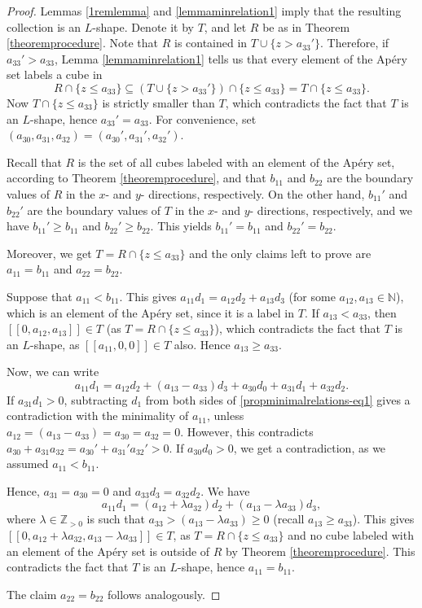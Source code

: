 \documentclass[12pt]{article}
\theoremstyle{remark}
\begin{document}
\begin{proof}
    Lemmas \ref{1remlemma} and \ref{lemmaminrelation1} imply that the resulting collection is an $L$-shape. Denote it by $T$, and let $R$ be as in Theorem \ref{theoremprocedure}.
    Note that $R$ is contained in $T \cup \{z > a_{33}'\}$. Therefore, if 
    $a_{33}'>a_{33}$, Lemma \ref{lemmaminrelation1} tells us that every element of the Ap{\'e}ry set labels a cube in 
    $$
    R \cap \{z \leq a_{33}\} \subseteq  \left(T \cup \{z > a_{33}'\} \right)\cap \{z \leq a_{33}\} = T \cap \{z \leq a_{33}\}.
    $$  
    Now $T \cap \{z \leq a_{33}\}$ is strictly smaller than $T$, which contradicts the fact that $T$ is an $L$-shape, hence $a_{33}'=a_{33}$. For convenience, set $(a_{30},a_{31},a_{32}) = (a_{30}',a_{31}',a_{32}')$.

    Recall that $R$ is the set of all cubes labeled with an element of the Ap{\'e}ry set, according to Theorem \ref{theoremprocedure}, and that $b_{11}$ and $b_{22}$ are the boundary values of $R$ in the $x$- and $y$- directions, respectively. On the other hand, $b_{11}'$ and $b_{22}'$ are the boundary values of $T$ in the $x$- and $y$- directions, respectively, and we have $b_{11}' \geq b_{11}$ and $b_{22}' \geq b_{22}$. This yields $b_{11}' = b_{11}$ and $b_{22}' = b_{22}$.
    
    Moreover, we get $T = R \cap \{z \leq a_{33}\}$ and 
    the only claims left to prove are $a_{11} = b_{11}$ and $a_{22} = b_{22}$.
    
    Suppose that $a_{11} < b_{11}$. This gives $a_{11}d_1 = a_{12}d_2 + a_{13}d_3$ (for some $a_{12},a_{13} \in \mathbb{N}$), which is an element of the Ap{\'e}ry set, since it is a label in $T$. 
    If $a_{13} < a_{33}$, then $[[0,a_{12},a_{13}]] \in T$ (as $T =R \cap \{z \leq a_{33}\} $), which contradicts the fact that $T$ is an $L$-shape, as $[[a_{11},0,0]] \in T$ also. Hence $a_{13} \geq a_{33}$.

    Now, we can write
    \begin{equation}\label{propminimalrelations-eq1}
        a_{11}d_1 =  a_{12}d_2 + (a_{13}-a_{33})d_3 + a_{30}d_0 + a_{31}d_1 + a_{32}d_2.
    \end{equation}
    If $a_{31}d_1 > 0$, subtracting $d_1$ from both sides of \eqref{propminimalrelations-eq1} gives a contradiction with the minimality of $a_{11}$, unless $a_{12} =  (a_{13}-a_{33})=a_{30}=a_{32}=0$. However, this contradicts $a_{30} + a_{31}a_{32}=a_{30}' + a_{31}'a_{32}' > 0$. If $a_{30}d_0 > 0$, we get a contradiction, as we assumed $a_{11} < b_{11}$. 
   
   Hence, $a_{31}=a_{30}=0$ and $a_{33}d_3 = a_{32}d_2$. We have 
   $$a_{11}d_1 =  (a_{12} + \lambda a_{32})d_2 + (a_{13}-\lambda a_{33})d_3,$$ 
   where $\lambda \in \mathbb{Z}_{>0}$ is such that $ a_{33} > (a_{13}-\lambda a_{33}) \geq 0$ (recall $a_{13} \geq a_{33}$). This gives $[[0,a_{12} + \lambda a_{32},a_{13}-\lambda a_{33}]] \in T$, as $T =R \cap \{z \leq a_{33}\} $ and no cube labeled with an element of the Ap{\'e}ry set is outside of $R$ by Theorem \ref{theoremprocedure}.
   This contradicts the fact that $T$ is an $L$-shape, hence $a_{11} = b_{11} $. 

   The claim $a_{22}=b_{22}$ follows analogously.
\end{proof}
\end{document}
